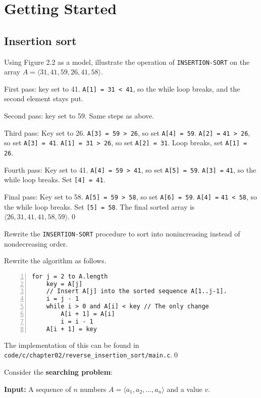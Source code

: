 \chapter{Getting Started}
\section{Insertion sort}

 Using Figure 2.2 as a model, illustrate the operation of \verb|INSERTION-SORT| on the array $A = \langle 31, 41, 59, 26, 41, 58\rangle$.

\sol First pass: key set to 41. \verb|A[1] = 31 < 41|, so the while loop breaks, and the second element stays put.

Second pass: key set to 59. Same steps as above.

Third pass: Key set to 26. \verb|A[3] = 59 > 26|, so set \verb|A[4] = 59|. \verb|A[2] =| \verb|41 > 26|, so set \verb|A[3] = 41|. \verb|A[1] = 31 > 26|, so set \verb|A[2] = 31|. Loop breaks, set \verb|A[1] = 26|.

Fourth pass: Key set to 41. \verb|A[4] = 59 > 41|, so set \verb|A[5] = 59|. \verb|A[3] =| \verb|41|, so the while loop breaks. Set \verb|[4] = 41|.

Final pass: Key set to 58. \verb|A[5] = 59 > 58|, so set \verb|A[6] = 59|. \verb|A[4] =| \verb|41 < 58|, so the while loop breaks. Set \verb|[5] = 58|. The final sorted array is $\langle 26, 31, 41, 41, 58, 59\rangle$.\qed

 Rewrite the \verb|INSERTION-SORT| procedure to sort into nonincreasing instead of nondecreasing order.

\sol Rewrite the algorithm as follows.
\begin{Verbatim}[frame=single,numbers=left,samepage=true,label=REVERSE-INSERTION-SORT(A)]
for j = 2 to A.length
    key = A[j]
    // Insert A[j] into the sorted sequence A[1..j-1].
    i = j - 1
    while i > 0 and A[i] < key // The only change
        A[i + 1] = A[i]
        i = i - 1
    A[i + 1] = key
\end{Verbatim}

The implementation of this can be found in \newline\verb|code/c/chapter02/reverse_insertion_sort/main.c|.\qed

 Consider the \textbf{searching problem}:

\textbf{Input:} A sequence of $n$ numbers $A = \langle a_1, a_2, \dots, a_n \rangle$ and a value $v$.

